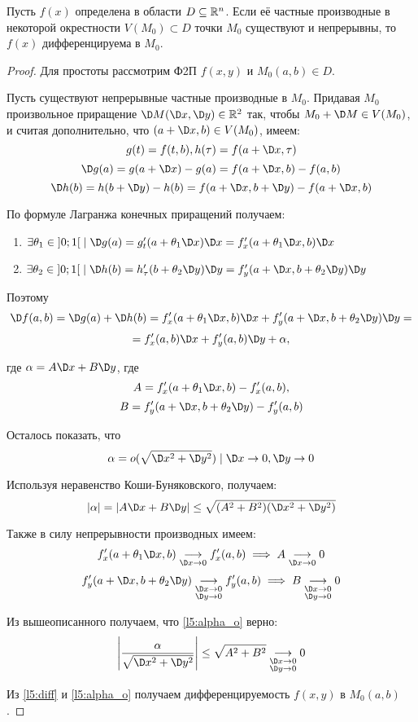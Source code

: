 \documentclass[../../main.tex]{subfiles}
\begin{document}
\begin{thm}
Пусть $f(x)$ определена в области $D \subseteq \mathbb{R}^n$. Если её
частные производные в некоторой окрестности $V(M_0)\subset D$ точки
$M_0$ существуют и непрерывны, то $f(x)$ дифференцируема в $M_0$.
\end{thm}
\begin{proof}
Для простоты рассмотрим Ф2П $f(x,y)$ и $M_0(a,b)\in D$.

Пусть существуют непрерывные частные производные в $M_0$. Придавая $M_0$ 
произвольное приращение $\D M(\D x,\D y)\in \R^2$ так, чтобы $M_0+\D M\in 
V(M_0)$, и считая дополнительно, что $(a+\D x,b)\in V(M_0)$, имеем:
\[ g(t)=f(t,b), h(\tau) = f(a+\D x,\tau) \]
\[ \D g(a)=g(a+\D x) -g(a) = f(a+\D x, b)-f(a,b) \]
\[ \D h(b)=h(b+\D y) -h(b) = f(a+\D x, b+\D y)-f(a+\D x,b) \]

По формуле Лагранжа конечных приращений получаем:
\begin{enumerate}
\item $ \exists \theta_1\in\left]0;1\right[\mid
\D g(a) = g'_t(a+\theta_1\D x)\D x=f'_x(a+\theta_1\D x,b)\D x $
\item $ \exists \theta_2\in\left]0;1\right[\mid
\D h(b) = h'_\tau(b+\theta_2\D y)\D y=f'_y(a+\D x, b+\theta_2\D y)\D y $
\end{enumerate}

Поэтому
\[\D f(a,b) = \D g(a) +\D h(b) = f'_x(a+\theta_1\D x,b)\D x+
f'_y(a+\D x, b+\theta_2\D y)\D y =\]
\begin{equation}
= f'_x(a,b)\D x +f'_y(a,b)\D y + \alpha,
\label{l5:diff}
\end{equation}

где $\alpha = A\D x+B\D y$, где
\[A = f'_x(a+\theta_1\D x,b)-f'_x(a,b),\]
\[B = f'_y(a+\D x, b+\theta_2\D y) - f'_y(a,b)\]

Осталось показать, что
\begin{equation}
\alpha = o(\sqrt{\D x^2 + \D y^2}) \mid \D x \to 0, \D y \to 0
\label{l5:alpha_o}
\end{equation}

Используя неравенство Коши-Буняковского, получаем:
\[\abs{\alpha} = \abs{A\D x+B\D y} \leq \sqrt{(A^2+B^2)(\D x^2+\D y^2)}\]

Также в силу непрерывности производных имеем:
\[f'_x(a+\theta_1\D x,b)\underset{\D x\to 0}\longrightarrow f'_x(a,b)
\implies A \underset{\D x\to 0}\longrightarrow 0\]
\[f'_y(a+\D x, b+\theta_2\D y) \underset{\substack{\D x\to 0 \\
\D y \to 0}}\longrightarrow f'_y(a,b)
\implies B \underset{\substack{\D x\to 0 \\\D y \to 0}}\longrightarrow 0\]

Из вышеописанного получаем, что \eqref{l5:alpha_o} верно:
\[\abs{\frac{\alpha}{\sqrt{\D x^2 + \D y^2}}} \leq
\sqrt{A^2+B^2} \underset{\substack{\D x\to 0 \\
\D y \to 0}}\longrightarrow 0\]

Из \eqref{l5:diff} и \eqref{l5:alpha_o} получаем дифференцируемость
$f(x,y)$ в $M_0(a,b)$.

\end{proof}
\end{document}
